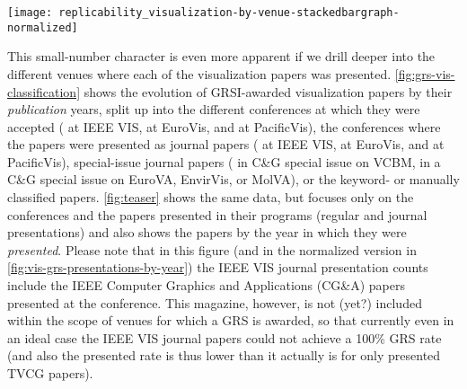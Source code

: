 \documentclass[conference,svgnames]{vgtc}                     %
\newcommand{\ie}{i.\,e.}
\begin{document}
\begin{figure*}
	\centering
	\texttt{[image: replicability\_visualization-by-venue-stackedbargraph-normalized]}
	\caption{Papers that can clearly be classified as visualization work (based on being accepted to visualization conferences, being journal presentations at visualization conferences,\textsuperscript{\ref{foot:vis_presentations},\ref{foot:c-and-g-special}} or having appeared in visualization-themed special issues in journals) by \emph{presentation} year (\ie, based on the \emph{conference years}, in which the papers were presented; same data as in \autoref{fig:teaser}), with their GRS proportions, normalized.}
	\label{fig:vis-grs-presentations-by-year}
\end{figure*}

This small-number character is even more apparent if we drill deeper into the different venues where each of the visualization papers was presented. \autoref{fig:grs-vis-classification} shows the evolution of GRSI-awarded visualization papers by their \emph{publication} years, split up into the different conferences at which they were accepted (\GrsiIeeeVisPapersCount{} at IEEE VIS, \GrsiEuroVisPapersCount{} at EuroVis, and \GrsiPacificVisTvcgPapersCount{} at PacificVis), the conferences where the papers were presented as journal papers (\GrsiIeeeVisTvcgJournalPresentationsCount{} at IEEE VIS, \GrsiEuroVisJournalPresentationsCount{} at EuroVis, and \GrsiPacificVisJournalPresentationsCount{} at PacificVis), special-issue journal papers (\GrsiVcbmCagPapersCount{} in C\&G special issue on VCBM, \GrsiCagSpecialIssuesPapersCount{} in a C\&G special issue on EuroVA, EnvirVis, or MolVA), or the \GrsiVisKeywordPlusManualPapersCount{} keyword- or manually classified papers. \autoref{fig:teaser} shows the same data, but focuses only on the conferences and the papers presented in their programs (regular and journal presentations) and also shows the papers by the year in which they were \emph{presented}. Please note that in this figure (and in the normalized version in \autoref{fig:vis-grs-presentations-by-year}) the IEEE VIS journal presentation counts include the IEEE Computer Graphics and Applications (CG\&A) papers presented at the conference. This magazine, however, is not (yet?) included within the scope of venues for which a GRS is awarded, so that currently even in an ideal case the IEEE VIS journal papers could not achieve a 100\% GRS rate (and also the presented rate is thus lower than it actually is for only presented TVCG papers).
\end{document}
